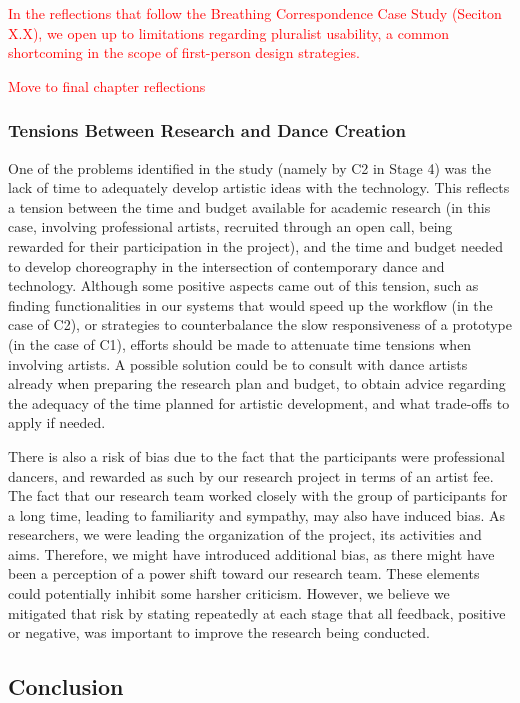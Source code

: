 \textcolor{red}{In the reflections that follow the Breathing Correspondence Case Study (Seciton X.X), we open up to limitations regarding pluralist usability, a common shortcoming in the scope of first-person design strategies.}

\textcolor{red}{Move to final chapter reflections}
\subsubsection{Tensions Between Research and Dance Creation}

One of the problems identified in the study (namely by C2 in Stage 4) was the lack of time to adequately develop artistic ideas with the technology. This reflects a tension between the time and budget available for academic research (in this case, involving professional artists, recruited through an open call, being rewarded for their participation in the project), and the time and budget needed to develop choreography in the intersection of contemporary dance and technology. Although some positive aspects came out of this tension, such as finding functionalities in our systems that would speed up the workflow (in the case of C2), or strategies to counterbalance the slow responsiveness of a prototype (in the case of C1), efforts should be made to attenuate time tensions when involving artists. A possible solution could be to consult with dance artists already when preparing the research plan and budget, to obtain advice regarding the adequacy of the time planned for artistic development, and what trade-offs to apply if needed.

There is also a risk of bias due to the fact that the participants were professional dancers, and rewarded as such by our research project in terms of an artist fee. The fact that our research team worked closely with the group of participants for a long time, leading to familiarity and sympathy, may also have induced bias. As researchers, we were leading the organization of the project, its activities and aims. Therefore, we might have introduced additional bias, as there might have been a perception of a power shift toward our research team. These elements could potentially inhibit some harsher criticism. However, we believe we mitigated that risk by stating repeatedly at each stage that all feedback, positive or negative, was important to improve the research being conducted.

\subsection{Conclusion}

